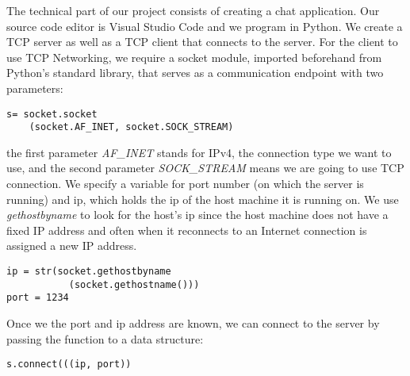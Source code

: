 The technical part of our project consists of creating a chat application. Our source code editor is Visual Studio Code and we program in Python. We create a TCP server as well as a TCP client that connects to the server. 
For the client to use TCP Networking, we require a socket module, imported beforehand from Python's standard library, that serves as a communication endpoint with two parameters:
\begin{verbatim}
s= socket.socket
    (socket.AF_INET, socket.SOCK_STREAM)
\end{verbatim}
the first parameter \textit{AF\_INET} stands for IPv4, the connection type we want to use, and the second parameter \textit{SOCK\_STREAM} means we are going to use TCP connection. We specify a variable for port number (on which the server is running) and ip, which holds the ip of the host machine it is running on. We use \textit{gethostbyname} to look for the host’s ip since the host machine does not have a fixed IP address and often when it reconnects to an Internet connection is assigned a new IP address.
\begin{verbatim}
ip = str(socket.gethostbyname
           (socket.gethostname()))
port = 1234
\end{verbatim}
Once we the port and ip address are known, we can connect to the server by passing the function to a data structure:
\begin{verbatim}
s.connect(((ip, port))
\end{verbatim}

